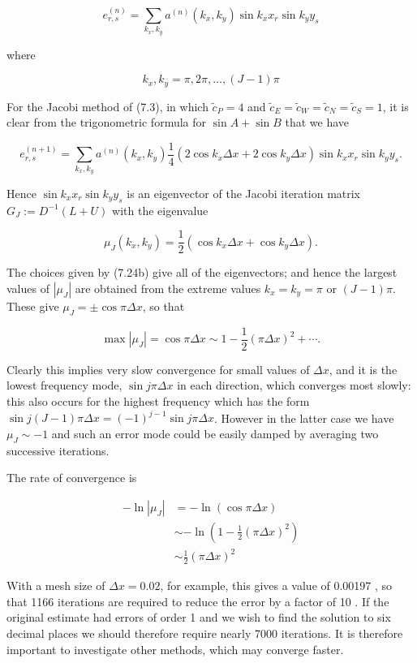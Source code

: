 \documentclass[10pt]{article}
\begin{document}
\[
e_{r, s}^{(n)}=\sum_{k_{x}, k_{y}} a^{(n)}\left(k_{x}, k_{y}\right) \sin k_{x} x_{r} \sin k_{y} y_{s}
\]

where

\[
k_{x}, k_{y}=\pi, 2 \pi, \ldots,(J-1) \pi
\]

For the Jacobi method of (7.3), in which \(\tilde{c}_{P}=4\) and \(\tilde{c}_{E}=\tilde{c}_{W}=\tilde{c}_{N}= \tilde{c}_{S}=1\), it is clear from the trigonometric formula for \(\sin A+\sin B\) that we have

\[
e_{r, s}^{(n+1)}=\sum_{k_{x}, k_{y}} a^{(n)}\left(k_{x}, k_{y}\right) \frac{1}{4}\left(2 \cos k_{x} \Delta x+2 \cos k_{y} \Delta x\right) \sin k_{x} x_{r} \sin k_{y} y_{s} .
\]

Hence \(\sin k_{x} x_{r} \sin k_{y} y_{s}\) is an eigenvector of the Jacobi iteration matrix \(G_{J}:=D^{-1}(L+U)\) with the eigenvalue

\[
\mu_{J}\left(k_{x}, k_{y}\right)=\frac{1}{2}\left(\cos k_{x} \Delta x+\cos k_{y} \Delta x\right) .
\]

The choices given by (7.24b) give all of the eigenvectors; and hence the largest values of \(\left|\mu_{J}\right|\) are obtained from the extreme values \(k_{x}=k_{y}=\pi\) or \((J-1) \pi\). These give \(\mu_{J}= \pm \cos \pi \Delta x\), so that

\[
\max \left|\mu_{J}\right|=\cos \pi \Delta x \sim 1-\frac{1}{2}(\pi \Delta x)^{2}+\cdots .
\]

Clearly this implies very slow convergence for small values of \(\Delta x\), and it is the lowest frequency mode, \(\sin j \pi \Delta x\) in each direction, which converges most slowly: this also occurs for the highest frequency which has the form \(\sin j(J-1) \pi \Delta x=(-1)^{j-1} \sin j \pi \Delta x\). However in the latter case we have \(\mu_{J} \sim-1\) and such an error mode could be easily damped by averaging two successive iterations.

The rate of convergence is

\[
\begin{aligned}
-\ln \left|\mu_{J}\right| & =-\ln (\cos \pi \Delta x) \\
& \sim-\ln \left(1-\frac{1}{2}(\pi \Delta x)^{2}\right) \\
& \sim \frac{1}{2}(\pi \Delta x)^{2}
\end{aligned}
\]

With a mesh size of \(\Delta x=0.02\), for example, this gives a value of 0.00197 , so that 1166 iterations are required to reduce the error by a factor of 10 . If the original estimate had errors of order 1 and we wish to find the solution to six decimal places we should therefore require nearly 7000 iterations. It is therefore important to investigate other methods, which may converge faster.
\end{document}
